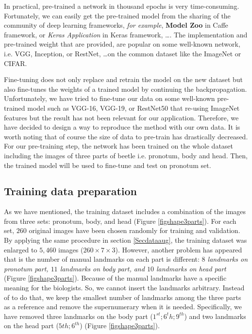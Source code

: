 \documentclass{article} %
\begin{document}
\begin{multicols}{2}
In practical, pre-trained a network in thousand epochs is very time-consuming. Fortunately, we can easily get the pre-trained model from the sharing of the community of deep learning frameworks, \textit{for example}, \textbf{Model Zoo} in Caffe framework, or \textit{Keras Application} in Keras framework, \ldots. The implementation and pre-trained weight that are provided, are popular on some well-known network, i.e. VGG, Inception, or RestNet, \ldots on the common dataset like the ImageNet or CIFAR. 

Fine-tuning does not only replace and retrain the model on the new
dataset but also fine-tunes the weights of a trained model by continuing the
backpropagation. Unfortunately, we have tried to fine-tune our data on some well-known pre-trained model such as VGG-16, VGG-19, or RestNet50 that re-using ImageNet features but the result has not been relevant for our application. Therefore, we have decided to design a way to reproduce the method with our
own data. It is worth noting that of course the size of data to pre-train has drastically decreased. For our pre-training step, the network has been trained on the whole dataset including the images of three parts of beetle i.e. pronotum, body and head. Then, the trained model will be used to fine-tune and test on pronotum set.

\subsection{Training data preparation}
As we have mentioned, the training dataset includes a combination of the images from three
sets: pronotum, body, and head (Figure \ref{figshape3parts}). For each
set, $260$ original images have been chosen randomly for training and
validation. By applying the same procedure in section \ref{Secdataaug},
the training dataset was enlarged to $5,460$ images ($260 \times 7
\times 3$). However, another problem has appeared that is the number of manual landmarks on each part is
different: \textit{$8$ landmarks on pronotum part, $11$ landmarks on
  body part, and $10$ landmarks on head part} (Figure \ref{figshape3parts}). Because of the manual landmarks
have a specific meaning for the biologists. So, we cannot insert the
landmarks arbitrary. Instead of to do that, we keep the smallest number of
landmarks among the three parts as a reference and remove the supernumerary when it is needed. Specifically, we have removed three landmarks on the body part
($1^{st}; 6^{t}h; 9^{th}$) and two landmarks on the head part ($5{th};
6^{th}$) (Figure \ref{figshape3parts}).


\end{multicols}
\end{document}
